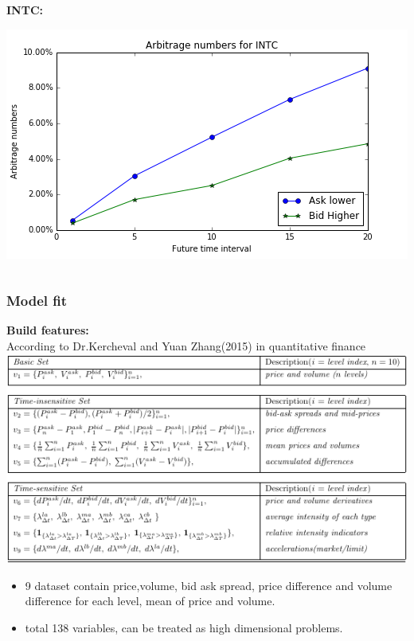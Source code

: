 \documentclass[xcolor={x11names,svgnames,dvipsnames}]{beamer}
\begin{document}
\begin{frame}
\begin{columns}
\begin{column}{.5\textwidth}
			 \textbf{INTC:}
	
										\includegraphics[width=1\textwidth, height=0.4\textheight]{INTC_arbitrage_time.png}

		\end{column}
	\end{columns}

\end{frame}





\begin{frame}
\frametitle{Model fit}
\textbf{Build features:}\\
According to Dr.Kercheval and Yuan Zhang(2015) in quantitative finance
	\includegraphics[width=1\textwidth, height=0.6\textheight]{features.png}
\begin{itemize}\footnotesize
			\item 9 dataset contain \alert{price,volume, bid ask spread, price difference and volume difference for each level, mean of price and volume.}  
            \item total 138 variables,  can be treated as high dimensional problems.
\end{itemize}
\end{frame}
\end{document}
